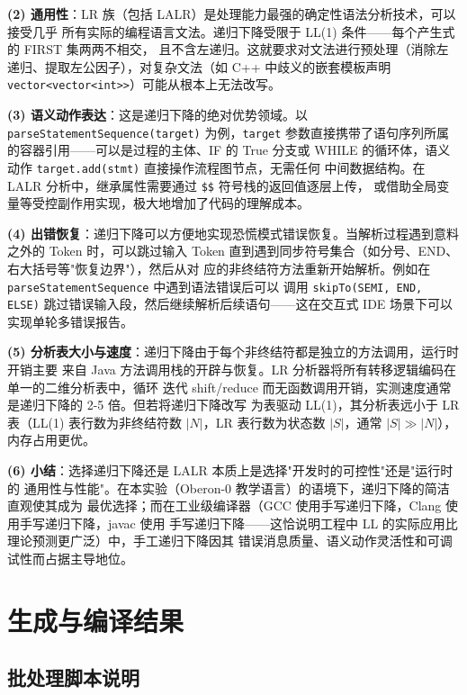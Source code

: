 \documentclass[a4paper]{article}
\begin{document}
\textbf{(2) 通用性}：LR 族（包括 LALR）是处理能力最强的确定性语法分析技术，可以接受几乎
所有实际的编程语言文法。递归下降受限于 LL(1) 条件——每个产生式的 FIRST 集两两不相交，
且不含左递归。这就要求对文法进行预处理（消除左递归、提取左公因子），对复杂文法（如 C++
中歧义的嵌套模板声明 \texttt{vector<vector<int>>}）可能从根本上无法改写。

\textbf{(3) 语义动作表达}：这是递归下降的绝对优势领域。以 \texttt{parseStatementSequence(target)}
为例，\texttt{target} 参数直接携带了语句序列所属的容器引用——可以是过程的主体、IF 的 True
分支或 WHILE 的循环体，语义动作 \texttt{target.add(stmt)} 直接操作流程图节点，无需任何
中间数据结构。在 LALR 分析中，继承属性需要通过 \texttt{\$\$} 符号栈的返回值逐层上传，
或借助全局变量等受控副作用实现，极大地增加了代码的理解成本。

\textbf{(4) 出错恢复}：递归下降可以方便地实现恐慌模式错误恢复。当解析过程遇到意料之外的 Token
时，可以跳过输入 Token 直到遇到同步符号集合（如分号、END、右大括号等"恢复边界"），然后从对
应的非终结符方法重新开始解析。例如在 \texttt{parseStatementSequence} 中遇到语法错误后可以
调用 \texttt{skipTo(SEMI, END, ELSE)} 跳过错误输入段，然后继续解析后续语句——这在交互式
IDE 场景下可以实现单轮多错误报告。

\textbf{(5) 分析表大小与速度}：递归下降由于每个非终结符都是独立的方法调用，运行时开销主要
来自 Java 方法调用栈的开辟与恢复。LR 分析器将所有转移逻辑编码在单一的二维分析表中，循环
迭代 shift/reduce 而无函数调用开销，实测速度通常是递归下降的 2-5 倍。但若将递归下降改写
为表驱动 LL(1)，其分析表远小于 LR 表（LL(1) 表行数为非终结符数 $|N|$，LR 表行数为状态数
$|S|$，通常 $|S| \gg |N|$），内存占用更优。

\textbf{(6) 小结}：选择递归下降还是 LALR 本质上是选择"开发时的可控性"还是"运行时的
通用性与性能"。在本实验（Oberon-0 教学语言）的语境下，递归下降的简洁直观使其成为
最优选择；而在工业级编译器（GCC 使用手写递归下降，Clang 使用手写递归下降，javac 使用
手写递归下降——这恰说明工程中 LL 的实际应用比理论预测更广泛）中，手工递归下降因其
错误消息质量、语义动作灵活性和可调试性而占据主导地位。

\section{生成与编译结果}

\subsection{批处理脚本说明}
\end{document}

